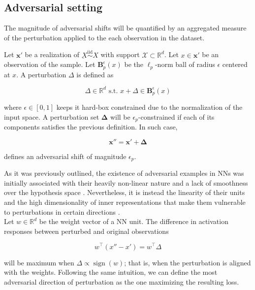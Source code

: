\subsection{Adversarial setting}

The magnitude of adversarial shifts will be quantified by an aggregated
measure of the perturbation applied to the each observation in the dataset.

\begin{definition}[Perturbation]
    Let $\bm{x}'$ be a realization of $\underbar{X} \overset{\text{iid}}{\sim} X$ with support $\mathcal{X} \subset \mathbb{R}^d$.
    Let $x \in \bm{x}'$ be an observation of the sample.
    Let $\mathbf{B}_p^\epsilon(x)$ be the $\ell_p$-norm ball of radius 
    $\epsilon$ centered at $x$. A perturbation $\Delta$ is defined as

    $$
        \Delta \in \mathbb{R}^d \text{ s.t. } x + \Delta \in \mathbf{B}_p^\epsilon(x)
    $$

    where $\epsilon \in [0, 1]$ keeps it hard-box constrained due to the
    normalization of the input space. A perturbation set $\bm{\Delta}$
    will be $\epsilon_p$-constrained if each of its components
    satisfies the previous definition. In such case,

    $$
        \bm{x}'' = \bm{x}' + \bm{\Delta}
    $$

    defines an adversarial shift of magnitude $\epsilon_p$.
\end{definition}

As it was previously outlined, the existence of adversarial
examples in NNs was initially associated with their heavily non-linear nature 
and a lack of smoothness over the hypothesis space
\cite{szegedyIntriguingPropertiesNeural2014}.
Nevertheless, it is instead the linearity of their units and the high 
dimensionality of inner representations that make them vulnerable
to perturbations in certain directions
\cite{goodfellowExplainingHarnessingAdversarial2015}.\\

Let $w \in \mathbb{R}^d$ be the weight vector of a NN unit.
The difference in activation responses between perturbed and original
observations

$$
w^\top (x'' - x') = w^\top \Delta
$$

will be maximum when $\Delta \propto \operatorname{sign}(w)$; that is,
when the perturbation is aligned with the weights. Following
the same intuition, we can define the most adversarial direction of 
perturbation as the one maximizing the resulting loss.

